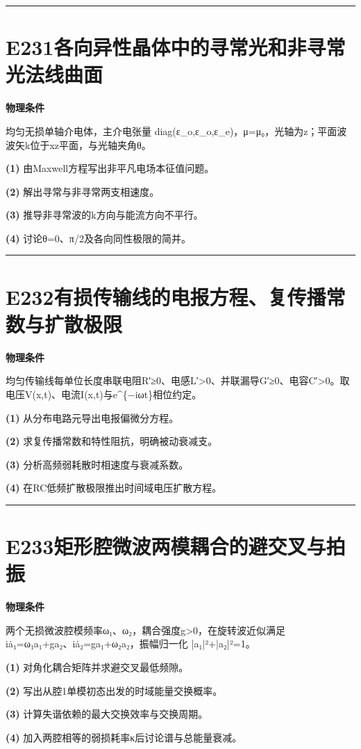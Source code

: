 \documentclass[UTF8,a4paper,11pt,oneside,openany]{ctexbook}
\begin{document}
\par\bigskip\hrule\bigskip
\section*{E231\quad 各向异性晶体中的寻常光和非寻常光法线曲面}
\textbf{物理条件}\par 均匀无损单轴介电体，主介电张量 diag(ε\_o,ε\_o,ε\_e)，μ=μ₀，光轴为z；平面波波矢k位于xz平面，与光轴夹角θ。
\par\noindent\textbf{(1)} 由Maxwell方程写出非平凡电场本征值问题。
\par\noindent\textbf{(2)} 解出寻常与非寻常两支相速度。
\par\noindent\textbf{(3)} 推导非寻常波的k方向与能流方向不平行。
\par\noindent\textbf{(4)} 讨论θ=0、π/2及各向同性极限的简并。

\par\bigskip\hrule\bigskip
\section*{E232\quad 有损传输线的电报方程、复传播常数与扩散极限}
\textbf{物理条件}\par 均匀传输线每单位长度串联电阻R′≥0、电感L′>0、并联漏导G′≥0、电容C′>0。取电压V(x,t)、电流I(x,t)与e\textasciicircum{}\{−iωt\}相位约定。
\par\noindent\textbf{(1)} 从分布电路元导出电报偏微分方程。
\par\noindent\textbf{(2)} 求复传播常数和特性阻抗，明确被动衰减支。
\par\noindent\textbf{(3)} 分析高频弱耗散时相速度与衰减系数。
\par\noindent\textbf{(4)} 在RC低频扩散极限推出时间域电压扩散方程。

\par\bigskip\hrule\bigskip
\section*{E233\quad 矩形腔微波两模耦合的避交叉与拍振}
\textbf{物理条件}\par 两个无损微波腔模频率ω₁、ω₂，耦合强度g>0，在旋转波近似满足 iȧ₁=ω₁a₁+ga₂、iȧ₂=ga₁+ω₂a₂，振幅归一化 |a₁|²+|a₂|²=1。
\par\noindent\textbf{(1)} 对角化耦合矩阵并求避交叉最低频隙。
\par\noindent\textbf{(2)} 写出从腔1单模初态出发的时域能量交换概率。
\par\noindent\textbf{(3)} 计算失谐依赖的最大交换效率与交换周期。
\par\noindent\textbf{(4)} 加入两腔相等的弱损耗率κ后讨论谱与总能量衰减。
\end{document}
